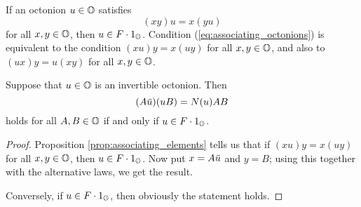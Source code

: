 \begin{proposition}
	\label{prop:associating_elements}
	If an octonion $u \in \mathbb{O}$ satisfies
	\begin{equation}
		\label{eq:associating_octonions}
		(xy)u = x(yu)
	\end{equation}
	for all $x,y \in \mathbb{O}$, then $u \in F\cdot 1_{\mathbb{O}}$. Condition (\ref{eq:associating_octonions})
	is equivalent to the condition $(xu)y = x(uy)$ for all $x,y \in \mathbb{O}$, and also to
	$(ux)y = u(xy)$ for all $x,y \in \mathbb{O}$. 
\end{proposition}

\begin{corollary}
	\label{cor:1_auub}
	Suppose that $u\in \mathbb{O}$ is an invertible octonion. Then
	\begin{equation}
		(A\mathord{\mbox{\hspace*{0pt}}\,\overline{\!u\!\!\;}\!\:}\mbox{\hspace*{0pt}})(u B) = N(u) AB
	\end{equation}
	holds for all $A,B \in \mathbb{O}$ if and only if $u \in F \cdot 1_{\mathbb{O}}$. 
\end{corollary}

\begin{proof}
	Proposition \ref{prop:associating_elements} tells us that if $(xu) y = x(uy)$ for all
	$x,y \in \mathbb{O}$, then $u \in F \cdot 1_{\mathbb{O}}$. Now put $x = A\mathord{\mbox{\hspace*{0pt}}\,\overline{\!u\!\!\;}\!\:}\mbox{\hspace*{0pt}}$ and $y = B$; using this together with
	the alternative laws, we get the result. 
	
	Conversely, if $u \in F\cdot 1_{\mathbb{O}}$, then obviously the statement holds. 
\end{proof}



